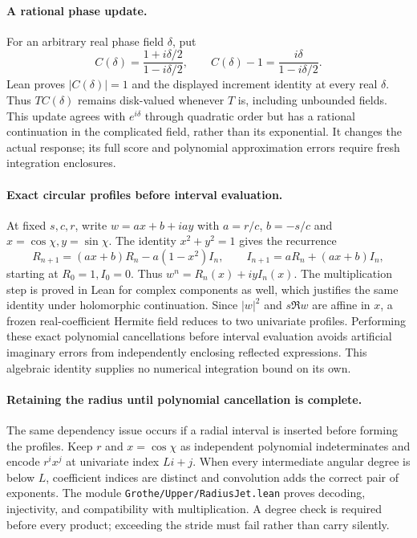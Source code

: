 \paragraph{A rational phase update.}
For an arbitrary real phase field $\delta$, put
\[
 C(\delta)=\frac{1+i\delta/2}{1-i\delta/2},\qquad
 C(\delta)-1=\frac{i\delta}{1-i\delta/2}.
\]
Lean proves $|C(\delta)|=1$ and the displayed increment identity at every
real $\delta$. Thus $TC(\delta)$ remains disk-valued whenever $T$ is,
including unbounded fields. This update agrees with $e^{i\delta}$ through
quadratic order but has a rational continuation in the complicated field,
rather than its exponential. It changes the actual response; its full score
and polynomial approximation errors require fresh integration enclosures.

\paragraph{Exact circular profiles before interval evaluation.}
At fixed $s,c,r$, write $w=ax+b+iay$ with $a=r/c$, $b=-s/c$ and
$x=\cos\chi,y=\sin\chi$. The identity $x^2+y^2=1$ gives the recurrence
\[
 R_{n+1}=(ax+b)R_n-a(1-x^2)I_n,\qquad
 I_{n+1}=aR_n+(ax+b)I_n,
\]
starting at $R_0=1,I_0=0$. Thus $w^n=R_n(x)+iyI_n(x)$.
The multiplication step is proved in Lean for complex components as well,
which justifies the same identity under holomorphic continuation.
Since $|w|^2$ and $s\Re w$ are affine in $x$, a frozen real-coefficient
Hermite field reduces to two univariate profiles. Performing these exact
polynomial cancellations before interval evaluation avoids artificial
imaginary errors from independently enclosing reflected expressions.
This algebraic identity supplies no numerical integration bound on its own.

\paragraph{Retaining the radius until polynomial cancellation is complete.}
The same dependency issue occurs if a radial interval is inserted before
forming the profiles. Keep $r$ and $x=\cos\chi$ as independent polynomial
indeterminates and encode $r^i x^j$ at univariate index $Li+j$.
When every intermediate angular degree is below $L$, coefficient indices
are distinct and convolution adds the correct pair of exponents. The
module \texttt{Grothe/Upper/RadiusJet.lean} proves decoding, injectivity,
and compatibility with multiplication. A degree check is required before
every product; exceeding the stride must fail rather than carry silently.

